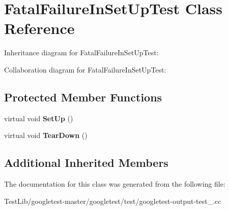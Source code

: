 \hypertarget{classFatalFailureInSetUpTest}{}\section{Fatal\+Failure\+In\+Set\+Up\+Test Class Reference}
\label{classFatalFailureInSetUpTest}


Inheritance diagram for Fatal\+Failure\+In\+Set\+Up\+Test\+:


Collaboration diagram for Fatal\+Failure\+In\+Set\+Up\+Test\+:
\subsection*{Protected Member Functions}
\begin{DoxyCompactItemize}
\item 
\mbox{\label{classFatalFailureInSetUpTest_a455696f86fb5f5393624221ccb79b373}} 
virtual void {\bfseries Set\+Up} ()
\item 
\mbox{\label{classFatalFailureInSetUpTest_a457707161063e08f7b6600ec5db449e4}} 
virtual void {\bfseries Tear\+Down} ()
\end{DoxyCompactItemize}
\subsection*{Additional Inherited Members}


The documentation for this class was generated from the following file\+:\begin{DoxyCompactItemize}
\item 
Test\+Lib/googletest-\/master/googletest/test/googletest-\/output-\/test\+\_\+.\+cc\end{DoxyCompactItemize}
